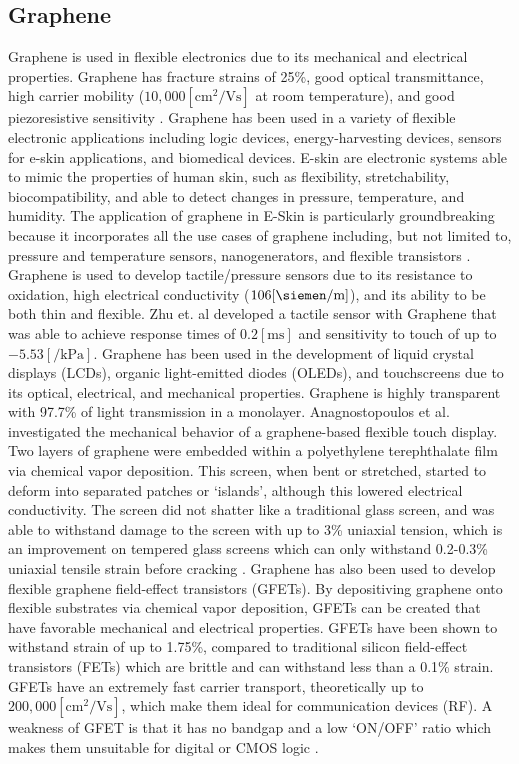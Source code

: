 \documentclass[conference]{IEEEtran}
\begin{document}
\subsection{Graphene}

Graphene is used in flexible electronics due to its mechanical and electrical properties. Graphene has fracture strains of 25\%, good optical transmittance, high carrier mobility ($10,000[\si{\centi\meter\squared\per\volt\second}]$ at room temperature), and good piezoresistive sensitivity \cite{tc1}. Graphene has been used in a variety of flexible electronic applications including logic devices, energy-harvesting devices, sensors for e-skin applications, and biomedical devices. E-skin are electronic systems able to mimic the properties of human skin, such as flexibility, stretchability, biocompatibility, and able to detect changes in pressure, temperature, and humidity. The application of graphene in E-Skin is particularly groundbreaking because it incorporates all the use cases of graphene including, but not limited to, pressure and temperature sensors, nanogenerators, and flexible transistors \cite{tc1}. Graphene is used to develop tactile/pressure sensors due to its resistance to oxidation, high electrical conductivity ($106[\si{\siemen\per\meter}]$), and its ability to be both thin and flexible. Zhu et. al \cite{tc5} developed a tactile sensor with Graphene that was able to achieve response times of $0.2[\si{\milli\second}]$ and sensitivity to touch of up to $-5.53[\si{\per\kilo\pascal}]$. Graphene has been used in the development of liquid crystal displays (LCDs), organic light-emitted diodes (OLEDs), and touchscreens due to its optical, electrical, and mechanical properties. Graphene is highly transparent with 97.7\% of light transmission in a monolayer. Anagnostopoulos et al. \cite{tc6} investigated the mechanical behavior of a graphene-based flexible touch display. Two layers of graphene were embedded within a polyethylene terephthalate film via chemical vapor deposition. This screen, when bent or stretched, started to deform into separated patches or `islands', although this lowered electrical conductivity. The screen did not shatter like a traditional glass screen, and was able to withstand damage to the screen with up to 3\% uniaxial tension, which is an improvement on tempered glass screens which can only withstand 0.2-0.3\% uniaxial tensile strain before cracking \cite{tc6}. Graphene has also been used to develop flexible graphene field-effect transistors (GFETs). By depositiving graphene onto flexible substrates via chemical vapor deposition, GFETs can be created that have favorable mechanical and electrical properties. GFETs have been shown to withstand strain of up to 1.75\%, compared to traditional silicon field-effect transistors (FETs) which are brittle and can withstand less than a 0.1\% strain. GFETs have an extremely fast carrier transport, theoretically up to $200,000[\si{\centi\meter\squared\per\volt\second}]$, which make them ideal for communication devices (RF). A weakness of GFET is that it has no bandgap and a low `\textsc{ON/OFF}' ratio which makes them unsuitable for digital or CMOS logic \cite{tc7}.
\end{document}
